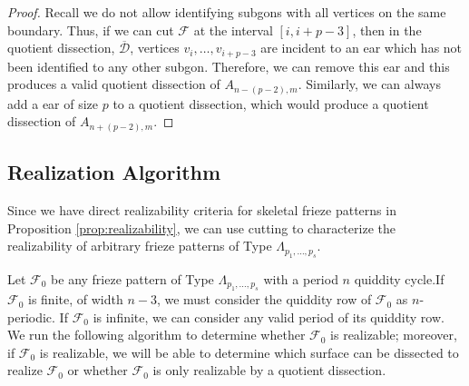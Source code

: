 \documentclass[12pt]{article}
\theoremstyle{remark}
\newcommand*{\F}{\mathcal{F}}
\newcommand*{\D}{\mathcal{D}}
\begin{document}
\begin{proof}
Recall we do not allow identifying subgons with all vertices on the same boundary. Thus, if we can cut $\F$ at the interval $[i,i+p-3]$, then in the quotient dissection, $\overline{\D}$, vertices $v_i,\ldots,v_{i+p-3}$ are incident to an ear which has not been identified to any other subgon. Therefore, we can remove this ear and this produces a valid quotient dissection of $A_{n-(p-2),m}$. Similarly, we can always add a ear of size $p$ to a quotient dissection, which would produce a quotient dissection of $A_{n+(p-2),m}$. 
\end{proof}

\subsection{Realization Algorithm}\label{subsec:RealizabilityAlgorithm}


Since we have direct realizability criteria for skeletal frieze patterns in Proposition \ref{prop:realizability}, we can use cutting to characterize the realizability of arbitrary frieze patterns of Type $\Lambda_{p_1,\ldots,p_s}$. 

Let $\F_0$ be any frieze pattern of Type $\Lambda_{p_1,\ldots,p_s}$ with a period $n$ quiddity cycle.If $\F_0$ is finite, of width $n-3$, we must consider the quiddity row of $\F_0$ as $n$-periodic. If $\F_0$ is infinite, we can consider any valid period of its quiddity row. We run the following algorithm to determine whether $\F_0$ is realizable; moreover, if $\F_0$ is realizable, we will be able to determine which surface can be dissected to realize $\F_0$ or whether $\F_0$ is only realizable by a quotient dissection.
\end{document}
